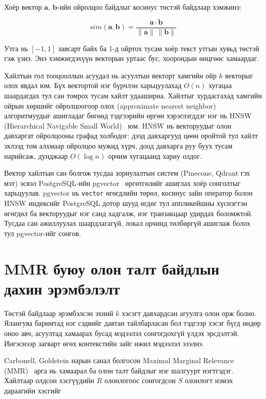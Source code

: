 \documentclass[../main.tex]{subfiles}
\begin{document}
Хоёр вектор $\mathbf{a}$, $\mathbf{b}$-ийн ойролцоо байдлыг косинус төстэй
байдлаар хэмжинэ:

\[
sim(\mathbf{a}, \mathbf{b})
  = \frac{\mathbf{a} \cdot \mathbf{b}}
         {\lVert\mathbf{a}\rVert \, \lVert\mathbf{b}\rVert}
\]

Утга нь $[-1, 1]$ завсарт байх ба 1-д ойртох тусам хоёр текст утгын хувьд
төстэй гэж үзнэ. Энэ хэмжигдэхүүн векторын уртаас бус, хоорондын өнцгөөс
хамаардаг.

Хайлтын гол тооцооллын асуудал нь асуултын векторт хамгийн ойр $k$ векторыг
олох явдал юм. Бүх вектортой нэг бүрчлэн харьцуулахад $O(n)$ хугацаа
шаардагдах тул сан томрох тусам хайлт удааширна. Хайлтыг хурдасгахад
хамгийн ойрын хөршийг ойролцоогоор олох (approximate nearest neighbor)
алгоритмуудыг ашигладаг бөгөөд тэдгээрийн өргөн хэрэглэгддэг
нэг нь HNSW (Hierarchical Navigable Small World)~\cite{malkov2018hnsw} юм.
HNSW нь векторуудыг олон давхаргат ойролцооны графад холбодог: дээд давхаргууд
цөөн оройтой тул хайлт эхлээд том алхмаар ойролцоо мужид хүрч, доод давхарга
руу буух тусам нарийсаж, дунджаар $O(\log n)$ орчим хугацаанд хариу олдог.

Вектор хайлтын сан болгож тусдаа зориулалтын систем (Pinecone, Qdrant гэх
мэт) эсвэл PostgreSQL-ийн pgvector~\cite{pgvector} өргөтгөлийг ашиглах хоёр
сонголтыг харьцуулав. pgvector нь \texttt{vector} өгөгдлийн төрөл, косинус
зайн оператор болон HNSW индексийг PostgreSQL дотор шууд өгдөг тул
аппликейшны хүснэгтэн өгөгдөл ба векторуудыг нэг санд хадгалж,
нэг транзакцаар удирдах боломжтой. Тусдаа сан ажиллуулах шаардлагагүй,
локал орчинд төлбөргүй ашиглаж болох тул pgvector-ийг сонгов.

\section{MMR буюу олон талт байдлын дахин эрэмбэлэлт}

Төстэй байдлаар эрэмбэлсэн эхний $k$ хэсэгт давхардсан агуулга олон орж
болно. Ялангуяа баримтад нэг сэдвийг давтан тайлбарласан бол тэдгээр хэсэг
бүгд өндөр оноо авч, асуултад хамаарах бусад мэдээлэл сонгогдохгүй үлдэх
эрсдэлтэй. Ингэснээр загварт өгөх контекстийн зайг ижил мэдээлэл эзэлнэ.

Carbonell, Goldstein нарын санал болгосон Maximal Marginal Relevance
(MMR)~\cite{carbonell1998mmr} арга нь хамаарал ба олон талт байдлыг нэг
шалгуурт нэгтгэдэг. Хайлтаар олдсон хэсгүүдийн $R$ олонлогоос сонгогдсон $S$
олонлогт нэмэх дараагийн хэсгийг
\end{document}
